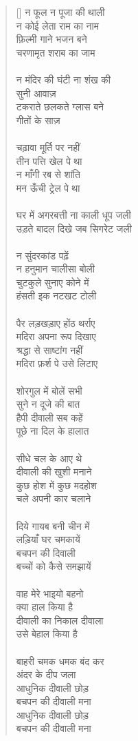 \begin{verse}[\versewidth]\texthindi{
न फूल न पूजा की थाली\\
न कोई लेता राम का नाम\\
फ़िल्मी गाने भजन बने\\
चरणामृत शराब का जाम\\
\\
न मंदिर की घंटी ना शंख की\\
सुनी आवाज़\\
टकराते छलकते ग्लास बने\\
गीतों के साज़\\
\\
चढ़ावा मूर्ति पर नहीं\\
तीन पत्ति खेल पे था\\
न माँगी रब से शांति\\
मन ऊँची ट्रेल पे था\\
\\
घर में अगरबत्ती ना काली धूप जली\\
उड़ते बादल दिखे जब सिगरेट जली\\
\\
न सुंदरकांड पढ़ें\\
न हनुमान चालीसा बोली\\
चुटकुले सुनाए कोने में\\
हंसती इक नटखट टोली\\
\\
पैर लड़खड़ाए होंठ थर्राए\\
मदिरा अपना रूप दिखाए\\
श्रद्धा से साष्टांग नहीं\\
मदिरा फ़र्श पे उसे लिटाए\\
\\
शोरगुल में बोलें सभी\\
सुने न दूजे की बात\\
हैपी दीवाली सब कहें\\
पूछे ना दिल के हालात\\
\\
सीधे चल के आए थे\\
दीवाली की खुशी मनाने\\
कुछ होश में कुछ मदहोश\\
चले अपनी कार चलाने\\
\\
दिये गायब बनी चीन में\\
लड़ियाँ घर चमकायें\\
बचपन की दिवाली\\
बच्चों को कैसे समझायें\\
\\
वाह मेरे भाइयो बहनो\\
क्या हाल किया है\\
दीवाली का निकाल दीवाला\\
उसे बेहाल किया है\\
\\
बाहरी चमक धमक बंद कर\\
अंदर के दीप जला\\
आधुनिक दीवाली छोड़\\
बचपन की दीवाली मना\\
आधुनिक दीवाली छोड़\\
बचपन की दीवाली मना\\
}\end{verse}

